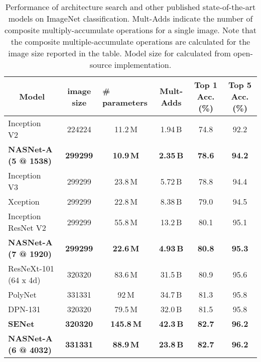 \begin{table*}[h!]
\centering
\small
\begin{tabular}{lc|cc|cc}
\toprule
\multicolumn{1}{c}{\bf Model} & {\bf image size} & \multicolumn{1}{l}{\bf \# parameters} & \bf Mult-Adds & \bf Top 1 Acc. (\%) & \bf Top 5 Acc. (\%) \\ \midrule
Inception V2~\cite{BatchNorm} & 224224 & 11.2\,M & 1.94\,B & 74.8 & 92.2 \\
\textbf{NASNet-A (5 @ 1538)} & \textbf{299299} & \textbf{10.9\,M} & \textbf{2.35\,B} & \textbf{78.6} & \textbf{94.2} \\
\midrule
Inception V3~\cite{szegedy2016rethinking} & 299299 & 23.8\,M & 5.72\,B & 78.8 & 94.4 \\
Xception~\cite{chollet2016xception}& 299299 & 22.8\,M & 8.38\,B & 79.0 & 94.5 \\
Inception ResNet V2~\cite{szegedy2016inception} & 299299 & 55.8\,M & 13.2\,B & 80.1 & 95.1 \\
\textbf{NASNet-A (7 @ 1920)} & \textbf{299299} & \textbf{22.6\,M} & \textbf{4.93\,B} & \textbf{80.8} & \textbf{95.3} \\
\midrule
ResNeXt-101 (64 x 4d)~\cite{xie2016aggregated} & 320320 & 83.6\,M & 31.5\,B & 80.9 & 95.6 \\
PolyNet~\cite{zhang2016polynet} & 331331 & 92\,M & 34.7\,B & 81.3 & 95.8 \\
DPN-131~\cite{dualpath} & 320320 & 79.5\,M & 32.0\,B & 81.5 & 95.8 \\
{\bf SENet~\cite{hu2017squeeze}}& {\bf 320320} & {\bf 145.8\,M} & {\bf 42.3\,B} & {\bf 82.7} & {\bf 96.2} \\

\textbf{NASNet-A (6 @ 4032)} & \textbf{331331} & \textbf{88.9\,M} & \textbf{23.8\,B} & \textbf{82.7} & \textbf{96.2} \\
\bottomrule
\end{tabular}

\vspace{0.2cm}
\caption{Performance of architecture search and other published state-of-the-art models on ImageNet classification. Mult-Adds indicate the number of composite multiply-accumulate operations for a single image. Note that the composite multiple-accumulate operations are calculated for the image size reported in the table. Model size for \cite{hu2017squeeze} calculated from open-source implementation.}
\label{tab:imagenet}
\end{table*}

